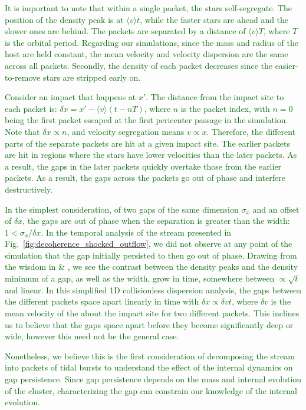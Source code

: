 \documentclass{aa}
\newcommand{\salvatore}[1]{\textcolor{darkgreen}{{#1}}}
\begin{document}
\begin{appendix}
    \salvatore{It is important to note that within a single packet, the stars self-segregate. The position of the density peak is at $\langle v \rangle t$, while the faster stars are ahead and the slower ones are behind. The packets are separated by a distance of $\langle  v\rangle T$, where $T$ is the orbital period. Regarding our simulations, since the mass and radius of the host are held constant, the mean velocity and velocity dispersion are the same across all packets. Secondly, the density of each packet decreases since the easier-to-remove stars are stripped early on. }



  \salvatore{Consider an impact that happens at $x\prime$. The distance from the impact site to each packet is: $\delta x= x\prime - \langle v\rangle \left(t-n T\right)$, where $n$ is the packet index, with $n=0$ being the first packet escaped at the first pericenter passage in the simulation. Note that $\delta x\propto n$, and velocity segregation means $v\propto x$. Therefore, the different parts of the separate packets are hit at a given impact site. The earlier packets are hit in regions where the stars have lower velocities than the later packets. As a result, the gaps in the later packets quickly overtake those from the earlier packets. As a result, the gaps across the packets go out of phase and interfere destructively.}

  \salvatore{In the simplest consideration, of two gaps of the same dimension $\sigma_x$ and an offset of $\delta x$, the gaps are out of phase when the separation is greater than the width: $1<\sigma_x/\delta x$. In the temporal analysis of the stream presented in Fig.~\ref{fig:decoherence_shocked_outflow}, we did not observe at any point of the simulation that the gap initially persisted to then go out of phase. Drawing from the wisdom in \citet{2015MNRAS.450.1136E} \& \citet{2016MNRAS.457.3817S}, we see the contrast between the density peaks and the density minimum of a gap, as well as the width, grow in time, somewhere between $\propto \sqrt{t}$ and linear. In this simplified 1D collisionless dispersion analysis, the gaps between the different packets space apart linearly in time with $\delta x\propto \delta vt$, where $\delta v$ is the mean velocity of the about the impact site for two different packets. This inclines us to believe that the gaps space apart before they become significantly deep or wide, however this need not be the general case. }


    \salvatore{Nonetheless, we believe this is the first consideration of decomposing the stream into packets of tidal bursts to understand the effect of the internal dynamics on gap persistence. Since gap persistence depends on the mass and internal evolution of the cluster, characterizing the gap can constrain our knowledge of the internal evolution. }




\end{appendix}
\end{document}
